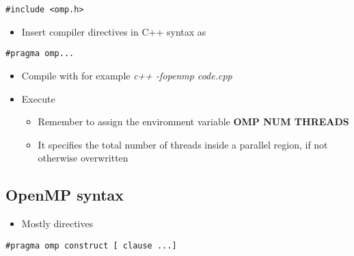 \documentclass[%
oneside,                 %
final,                   %
10pt]{article}
\begin{document}
\noindent


\begin{verbatim}
#include <omp.h>

\end{verbatim}

\begin{itemize}
 \item Insert compiler directives in C++ syntax as 
\end{itemize}

\noindent


\begin{verbatim}
#pragma omp...

\end{verbatim}

\begin{itemize}
\item Compile with for example \emph{c++ -fopenmp code.cpp}

\item Execute
\begin{itemize}

  \item Remember to assign the environment variable \textbf{OMP NUM THREADS}

  \item It specifies the total number of threads inside a parallel region, if not otherwise overwritten
\end{itemize}

\noindent
\end{itemize}

\noindent



\subsection*{OpenMP syntax}
\begin{itemize}
\item Mostly directives
\end{itemize}

\noindent


\begin{verbatim}
#pragma omp construct [ clause ...]

\end{verbatim}
\end{document}
